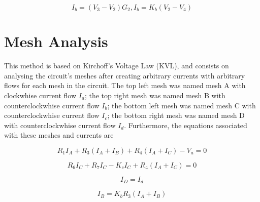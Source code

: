 \begin{equation}
  I_b = (V_3 - V_2)G_2 , I_b = K_b(V_2 - V_4)
  \label{eq:kvl8}
\end{equation}

\section{Mesh Analysis}

This method is based on Kirchoff's Voltage Law (KVL), and consists on analysing the circuit's meshes
after creating arbitrary currents with arbitrary flows for each mesh in the circuit. The top left mesh
was named mesh A with clockwhise current flow $I_a$; the top right mesh was named mesh B with counterclockwhise
current flow $I_b$; the bottom left mesh was named mesh C with counterclockwhise current flow $I_c$; the bottom right
mesh was named mesh D with counterclockwhise current flow $I_d$. Furthermore, the equations associated with these meshes
and currents are

\begin{equation}
  R_1 I_A + R_3(I_A + I_B) + R_4(I_A + I_C) - V_a = 0
  \label{eq:kvl}
\end{equation}

\begin{equation}
R_6 I_C + R_7 I_C - K_c I_C + R_4(I_A + I_C) = 0
  \label{eq:kvl2}
\end{equation}

\begin{equation}
  I_D = I_d
  \label{eq:kvl3}
\end{equation}

\begin{equation}
  I_B = K_b R_3(I_A + I_B)
  \label{eq:kvl4}
\end{equation}








